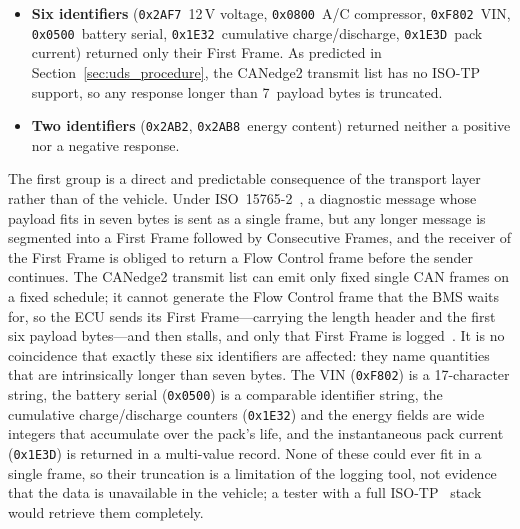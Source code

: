 \documentclass[11pt,a4paper,oneside,parskip=half]{scrreprt}
\providecommand{\hex}{}\renewcommand{\hex}[1]{\texttt{0x#1}}
\begin{document}
\begin{itemize}
  \item \textbf{Six identifiers} (\hex{2AF7}~12\,V voltage, \hex{0800}~A/C compressor, \hex{F802}~VIN, \hex{0500}~battery serial, \hex{1E32}~cumulative charge/dis\-charge, \hex{1E3D}~pack current) returned only their First Frame. As predicted in Section~\ref{sec:uds_procedure}, the CANedge2 transmit list has no ISO-TP support, so any response longer than 7~payload bytes is truncated.
  \item \textbf{Two identifiers} (\hex{2AB2}, \hex{2AB8}~energy content) returned neither a positive nor a negative response.
\end{itemize}

The first group is a direct and predictable consequence of the transport layer rather than of the vehicle. Under ISO~15765-2~\cite{iso15765}, a diagnostic message whose payload fits in seven bytes is sent as a single frame, but any longer message is segmented into a First Frame followed by Consecutive Frames, and the receiver of the First Frame is obliged to return a Flow Control frame before the sender continues. The CANedge2 transmit list can emit only fixed single CAN frames on a fixed schedule; it cannot generate the Flow Control frame that the BMS waits for, so the ECU sends its First Frame---carrying the length header and the first six payload bytes---and then stalls, and only that First Frame is logged~\cite{csselectronics_canedge2}. It is no coincidence that exactly these six identifiers are affected: they name quantities that are intrinsically longer than seven bytes. The VIN (\hex{F802}) is a 17-character string, the battery serial (\hex{0500}) is a comparable identifier string, the cumulative charge/discharge counters (\hex{1E32}) and the energy fields are wide integers that accumulate over the pack's life, and the instantaneous pack current (\hex{1E3D}) is returned in a multi-value record. None of these could ever fit in a single frame, so their truncation is a limitation of the logging tool, not evidence that the data is unavailable in the vehicle; a tester with a full ISO-TP~\cite{iso15765} stack would retrieve them completely.
\end{document}

